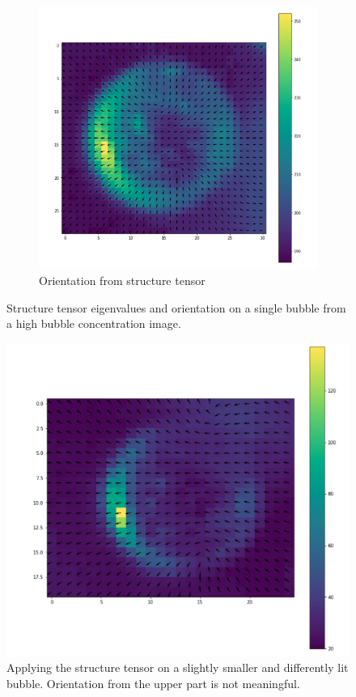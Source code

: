 \begin{figure}
			\begin{subfigure}[t]{.55\textwidth}
				\includegraphics[scale=0.5]{images/struct_tensor_orientation.png}
				\caption{Orientation from structure tensor}		
			\end{subfigure}
			
			\caption{Structure tensor eigenvalues and orientation on a single bubble from a high bubble concentration image.}
			\label{fig:struct_tensor_result}
		\end{figure}
		
					
			\begin{figure}
				\includegraphics[scale=0.5]{images/struct_tensor_result_2.png}
				\caption{Applying the structure tensor on a slightly smaller and differently lit bubble. Orientation from the upper part is not meaningful. }
				\label{fig:struct_tensor_result_2}
			\end{figure}
	
